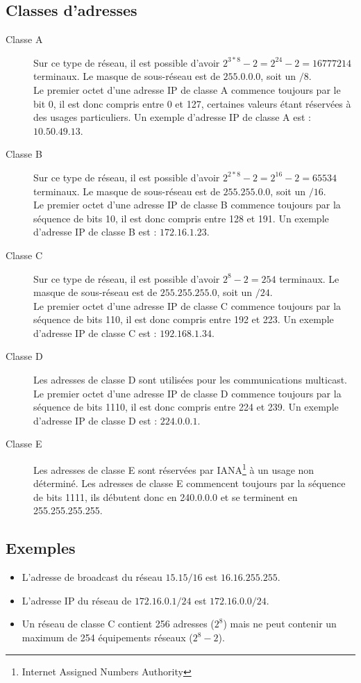 \subsection{Classes d'adresses}
\begin{description}
 \item[Classe A] Sur ce type de réseau, il est possible d'avoir $2^{3*8}-2=2^{24}-2=16777214$ terminaux. Le masque de sous-réseau est de $255.0.0.0$, soit un $/8$.\\Le premier octet d'une adresse IP de classe A commence toujours par le bit 0, il est donc compris entre 0 et 127, certaines valeurs étant réservées à des usages particuliers. Un exemple d'adresse IP de classe A est : $10.50.49.13$.
 \item[Classe B] Sur ce type de réseau, il est possible d'avoir $2^{2*8}-2=2^{16}-2=65534$ terminaux. Le masque de sous-réseau est de $255.255.0.0$, soit un $/16$.\\Le premier octet d'une adresse IP de classe B commence toujours par la séquence de bits 10, il est donc compris entre 128 et 191. Un exemple d'adresse IP de classe B est : $172.16.1.23$.
 \item[Classe C] Sur ce type de réseau, il est possible d'avoir $2^{8}-2=254$ terminaux. Le masque de sous-réseau est de $255.255.255.0$, soit un $/24$.\\Le premier octet d'une adresse IP de classe C commence toujours par la séquence de bits 110, il est donc compris entre 192 et 223. Un exemple d'adresse IP de classe C est : $192.168.1.34$.
 \item[Classe D] Les adresses de classe D sont utilisées pour les communications multicast. Le premier octet d'une adresse IP de classe D commence toujours par la séquence de bits 1110, il est donc compris entre 224 et 239. Un exemple d'adresse IP de classe D est : $224.0.0.1$.
 \item[Classe E] Les adresses de classe E sont réservées par IANA\footnote{Internet Assigned Numbers Authority} à un usage non déterminé. Les adresses de classe E commencent toujours par la séquence de bits 1111, ils débutent donc en 240.0.0.0 et se terminent en 255.255.255.255.
\end{description}

\subsection{Exemples}
\begin{itemize}
 \item L'adresse de broadcast du réseau $15.15/16$ est $16.16.255.255$.
 \item L'adresse IP du réseau de $172.16.0.1/24$ est $172.16.0.0/24$.
 \item Un réseau de classe C contient 256 adresses ($2^8$) mais ne peut contenir un maximum de 254 équipements réseaux ($2^{8}-2$).
\end{itemize}
